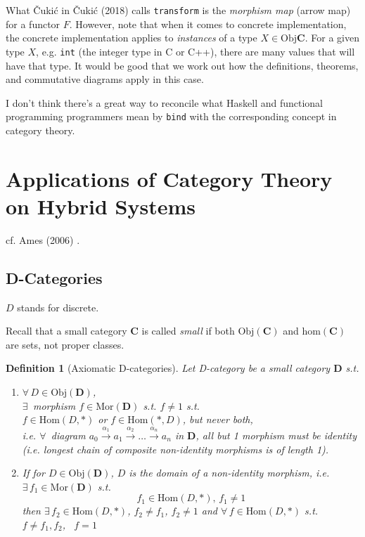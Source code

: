 \documentclass[10pt]{amsart}
\newtheorem{definition}{Definition}
\begin{document}
\begin{multicols*}{2}
What \v{C}uki\'{c} in \v{C}uki\'{c} (2018) \cite{Cuki2018} calls \texttt{transform} is the \emph{morphism map} (arrow map) for a functor $F$. However, note that when it comes to concrete implementation, the concrete implementation applies to \emph{instances} of a type $X \in \text{Obj}{\mathbf{C}}$. For a given type $X$, e.g. \verb|int| (the integer type in C or C++), there are many values that will have that type. It would be good that we work out how the definitions, theorems, and commutative diagrams apply in this case.


I don't think there's a great way to reconcile what Haskell and functional programming programmers mean by \texttt{bind} with the corresponding concept in category theory. 


\section{Applications of Category Theory on Hybrid Systems}

cf. Ames (2006) \cite{Ames2006}.
	
\subsection{D-Categories}

$D$ stands for discrete.

Recall that a small category $\mathbf{C}$ is called \emph{small} if both $\text{Obj}(\mathbf{C})$ and $\text{hom}(\mathbf{C})$ are sets, not proper classes. 

\begin{definition}[Axiomatic D-categories]
Let D-category be a \emph{small} category $\mathbf{D}$ s.t.
\begin{enumerate}
	\item $\forall \, D \in \text{Obj}(\mathbf{D})$, \\
	$\exists \,$ morphism $f \in \text{Mor}(\mathbf{D})$ s.t. $f \neq 1$ s.t. \\
	$f \in \text{Hom}(D, *)$ or $f\in \text{Hom}(*, D)$, but never both, \\
	i.e. $\forall \, $ diagram $a_0 \xrightarrow{ \alpha_1} a_1 \xrightarrow{ \alpha_2} \dots \xrightarrow{ \alpha_n} a_n$ in $\mathbf{D}$, all but 1 morphism must be identity (i.e. longest chain of composite non-identity morphisms is of length 1). 
	\item If for $D\in \text{Obj}(\mathbf{D})$, $D$ is the domain of a non-identity morphism, i.e. $\exists \, f_1 \in \text{Mor}(\mathbf{D})$ s.t. 
	\[
	f_1 \in \text{Hom}(D, *), \, f_1 \neq 1
	\]
	then $\exists \, f_2 \in \text{Hom}(D, *)$, $f_2 \neq f_1$, $f_2 \neq 1$ and $\forall \, f \in \text{Hom}(D, *)$ s.t. $f\neq f_1,f_2$, \, $f=1$
\end{enumerate}
\end{definition}
	

\end{multicols*}
\end{document}
